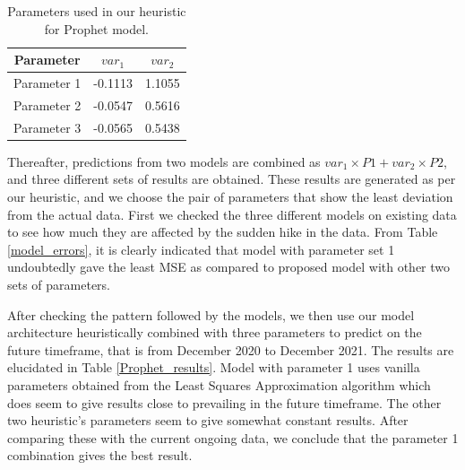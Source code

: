 \documentclass[times,twocolumn,final,authoryear]{elsarticle}
\begin{document}
	
	\begin{table}[!t]
		\renewcommand{\arraystretch}{1.3}
		\caption{Parameters used in our heuristic for Prophet model.}
		\label{params_table}
		\centering
		\begin{tabular}{|c||c|c|}
			\hline
			\textbf{Parameter} & \textbf{\(var_1\)} & \textbf{\(var_2\)}\\
			\hline
			Parameter 1 & -0.1113 & 1.1055\\
			Parameter 2 & -0.0547 & 0.5616\\
			Parameter 3 & -0.0565 & 0.5438\\
			\hline
		\end{tabular}
	\end{table}
	
	Thereafter, predictions from two models are combined as \(var_1 \times P1 + var_2 \times P2\), and three different sets of results are obtained. These results are generated as per our heuristic, and we choose the pair of parameters that show the least deviation from the actual data. First we checked the three different models on existing data to see how much they are affected by the sudden hike in the data. From Table \ref{model_errors}, it is clearly indicated that model with parameter set 1 undoubtedly gave the least MSE as compared to proposed model with other two sets of parameters. 
	
%	
%	
	
	After checking the pattern followed by the models, we then use our model architecture heuristically combined with three parameters to predict on the future timeframe, that is from December 2020 to December 2021. The results are elucidated in Table \ref{Prophet_results}. Model with parameter 1 uses vanilla parameters obtained from the Least Squares Approximation algorithm which does seem to give results close to prevailing in the future timeframe. The other two heuristic's parameters seem to give somewhat constant results. After comparing these with the current ongoing data, we conclude that the parameter 1 combination gives the best result.
	
\end{document}
